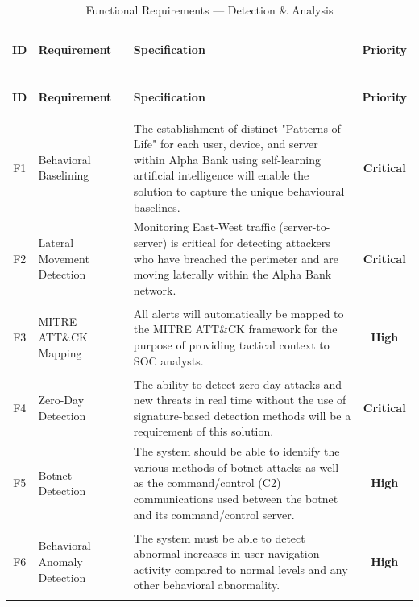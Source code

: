 \documentclass[12pt,a4paper]{report}
\newcommand{\critical}{\textbf{Critical}}
\newcommand{\high}{\textbf{High}}
\begin{document}
\captionsetup{singlelinecheck=false, justification=raggedright}
\renewcommand{\arraystretch}{1.4}

\begin{xltabular}{\textwidth}{c >{\bfseries\raggedright\arraybackslash}p{3.2cm} >{\raggedright\arraybackslash}X c}
    
    \caption{Functional Requirements --- Detection \& Analysis}
    \label{tab:functional} \\
    \toprule
    \textbf{ID} & \textbf{Requirement} & \textbf{Specification} & \textbf{Priority} \\
    \midrule
    \endfirsthead
    
     \\
    \toprule
    \textbf{ID} & \textbf{Requirement} & \textbf{Specification} & \textbf{Priority} \\
    \midrule
    \endhead
    
  
    
    \bottomrule
    \endlastfoot
    
    F1 & Behavioral Baselining &
    The establishment of distinct "Patterns of Life" for each user, device, and server within Alpha Bank using self-learning artificial intelligence will enable the solution to capture the unique behavioural baselines. & \critical \\
    
    F2 & Lateral Movement Detection &
    Monitoring East-West traffic (server-to-server) is critical for detecting attackers who have breached the perimeter and are moving laterally within the Alpha Bank network. & \critical \\
    
    F3 & MITRE ATT\&CK Mapping &
    All alerts will automatically be mapped to the MITRE ATT\&CK framework for the purpose of providing tactical context to SOC analysts. & \high \\
    
    F4 & Zero-Day Detection &
    The ability to detect zero-day attacks and new threats in real time without the use of signature-based detection methods will be a requirement of this solution. & \critical \\
    
    F5 & Botnet Detection &
    The system should be able to identify the various methods of botnet attacks as well as the command/control (C2) communications used between the botnet and its command/control server. & \high \\
    
    F6 & Behavioral Anomaly Detection &
    The system must be able to detect abnormal increases in user navigation activity compared to normal levels and any other behavioral abnormality. & \high \\
    
\end{xltabular}
\end{document}
